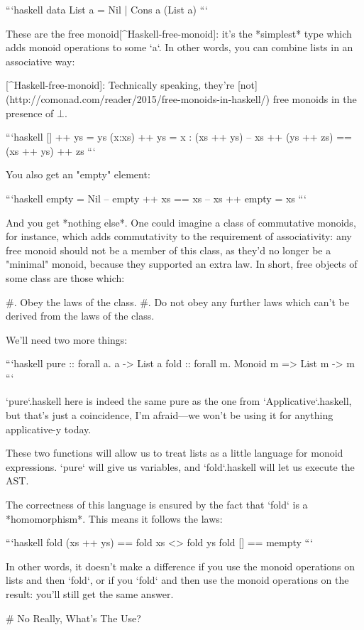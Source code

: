 \documentclass{article}
\begin{document}
```haskell
data List a = Nil | Cons a (List a)
```

These are the free monoid[^Haskell-free-monoid]: it's the *simplest* type which
adds monoid operations to some `a`. In other words, you can combine lists in an
associative way:

[^Haskell-free-monoid]: Technically speaking, they're
    [not](http://comonad.com/reader/2015/free-monoids-in-haskell/) free monoids
    in the presence of $\bot$.

```haskell
[] ++ ys = ys
(x:xs) ++ ys = x : (xs ++ ys)
-- xs ++ (ys ++ zs) == (xs ++ ys) ++ zs
```

You also get an "empty" element:

```haskell
empty = Nil
-- empty ++ xs == xs
-- xs ++ empty = xs
```

And you get *nothing else*. One could imagine a class of commutative monoids,
for instance, which adds commutativity to the requirement of associativity: any
free monoid should not be a member of this class, as they'd no longer be a
"minimal" monoid, because they supported an extra law. In short, free objects of
some class are those which:

#. Obey the laws of the class.
#. Do not obey any further laws which can't be derived from the laws of the
   class.

We'll need two more things:

```haskell
pure :: forall a.             a -> List a
fold :: forall m. Monoid m => List m -> m
```

`pure`{.haskell} here is indeed the same pure as the one from
`Applicative`{.haskell}, but that's just a coincidence, I'm afraid---we won't be
using it for anything applicative-y today.

These two functions will allow us to treat lists as a little language for monoid
expressions. `pure` will give us variables, and `fold`{.haskell} will let us
execute the AST.

The correctness of this language is ensured by the fact that `fold` is a
*homomorphism*. This means it follows the laws:

```haskell
fold (xs ++ ys) == fold xs <> fold ys
fold [] == mempty
```

In other words, it doesn't make a difference if you use the monoid operations on
lists and then `fold`, or if you `fold` and then use the monoid operations
on the result: you'll still get the same answer.

# No Really, What's The Use?
\end{document}
